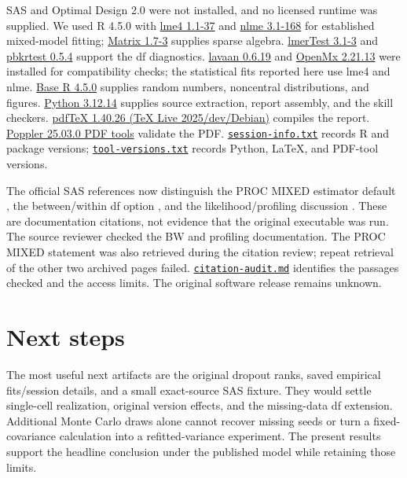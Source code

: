\documentclass[11pt]{article}
\begin{document}
SAS and Optimal Design 2.0 were not installed, and no licensed runtime was supplied. We used R 4.5.0 with \href{https://github.com/lme4/lme4}{lme4 1.1-37} and \href{https://cran.r-project.org/package=nlme}{nlme 3.1-168} for established mixed-model fitting; \href{https://cran.r-project.org/package=Matrix}{Matrix 1.7-3} supplies sparse algebra. \href{https://cran.r-project.org/package=lmerTest}{lmerTest 3.1-3} and \href{https://cran.r-project.org/package=pbkrtest}{pbkrtest 0.5.4} support the df diagnostics. \href{https://cran.r-project.org/package=lavaan}{lavaan 0.6.19} and \href{https://cran.r-project.org/package=OpenMx}{OpenMx 2.21.13} were installed for compatibility checks; the statistical fits reported here use lme4 and nlme. \href{https://www.r-project.org/}{Base R 4.5.0} \citep{rcore2025} supplies random numbers, noncentral distributions, and figures. \href{https://www.python.org/}{Python 3.12.14} supplies source extraction, report assembly, and the skill checkers. \href{https://tug.org/texlive/}{pdfTeX 1.40.26 (TeX Live 2025/dev/Debian)} compiles the report. \href{https://poppler.freedesktop.org/}{Poppler 25.03.0 PDF tools} validate the PDF. \href{https://github.com/alectionary/vibe-math/blob/master/formalization/kupzyk-power-assumptions/outputs/session-info.txt}{\nolinkurl{session-info.txt}} records R and package versions; \href{https://github.com/alectionary/vibe-math/blob/master/formalization/kupzyk-power-assumptions/outputs/tool-versions.txt}{\nolinkurl{tool-versions.txt}} records Python, LaTeX, and PDF-tool versions.

The official SAS references now distinguish the PROC MIXED estimator default \citep{sasreml}, the between/within df option \citep{sasbw}, and the likelihood/profiling discussion \citep{sasprofile}. These are documentation citations, not evidence that the original executable was run. The source reviewer checked the BW and profiling documentation. The PROC MIXED statement was also retrieved during the citation review; repeat retrieval of the other two archived pages failed. \href{https://github.com/alectionary/vibe-math/blob/master/formalization/kupzyk-power-assumptions/notes/citation-audit.md}{\nolinkurl{citation-audit.md}} identifies the passages checked and the access limits. The original software release remains unknown.

\section{Next steps}
The most useful next artifacts are the original dropout ranks, saved empirical fits/session details, and a small exact-source SAS fixture. They would settle single-cell realization, original version effects, and the missing-data df extension. Additional Monte Carlo draws alone cannot recover missing seeds or turn a fixed-covariance calculation into a refitted-variance experiment. The present results support the headline conclusion under the published model while retaining those limits.

\appendix
\end{document}
